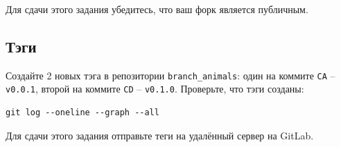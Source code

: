 \documentclass{article}
\begin{document}
\noindent Для сдачи этого задания убедитесь, что ваш форк является публичным.


\subsection{Тэги}
Создайте 2 новых тэга в репозитории \texttt{branch\_animals}: один на коммите \texttt{CA} -- \texttt{v0.0.1}, второй на коммите \texttt{CD} -- \texttt{v0.1.0}. Проверьте, что тэги созданы:
\begin{lstlisting}
git log --oneline --graph --all
\end{lstlisting}
Для сдачи этого задания отправьте теги на удалённый сервер на GitLab.

\end{document}
